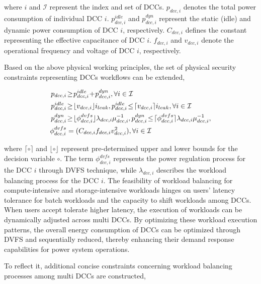 \documentclass[lettersize,journal]{IEEEtran}
\begin{document}
\noindent
where $i$ and $\mathcal{I}$ represent the index and set of DCCs. $p_{dcc,i}$ denotes the total power consumption of individual DCC $i$. $p_{dcc,i}^{idle}$ and $p_{dcc,i}^{dyn}$ represent the static (idle) and dynamic power consumption of DCC $i$, respectively. $C_{dcc,i}$ defines the constant representing the effective capacitance of DCC $i$. $f_{dcc,i}$ and $v_{dcc,i}$ denote the operational frequency and voltage of DCC $i$, respectively.

Based on the above physical working principles, the set of physical security constraints representing DCCs workflows can be extended,

\vspace{-0.25cm}
\begin{subequations}
  \begin{align}
    p_{dcc,i} & \!\geq\! p_{dcc,i}^{idle} \!+\! p_{dcc,i}^{dyn},\forall i\in\mathcal{I}\\
    p_{dcc,i}^{idle} &\!\geq\! \lfloor {v}_{dcc,i}\rfloor i_{leak},p_{dcc,i}^{idle} \!\leq\! \lceil {v}_{dcc,i}\rceil i_{leak},\forall i\in\mathcal{I}\\
    p_{dcc,i}^{dyn}& \!\geq\! \lfloor \phi_{dcc,i}^{dvfs} \rfloor {\lambda_{dcc,i}}{\mu_{dcc,i}^{-1}}, p_{dcc,i}^{dyn} \!\leq\! \lceil \phi_{dcc,i}^{dvfs} \rceil {\lambda_{dcc,i}}{\mu_{dcc,i}^{-1}},\notag \\
    \phi_{dcc,i}^{dvfs} &= ( C_{dcc,i} f_{dcc,i} v_{dcc,i}^{2} ), \forall i\in \mathcal{I}
  \end{align}
\end{subequations}

\noindent
where $\lceil {\circ} \rceil$ and $\lfloor {\circ} \rfloor$ represent pre-determined upper and lower bounds for the decision variable $\circ$. The term $\phi_{dcc,i}^{dvfs}$ represents the power regulation process for the DCC $i$ through DVFS technique, while $\lambda_{dcc,i}$ describes the workload balancing process for the DCC $i$. The feasibility of workload balancing for compute-intensive and storage-intensive workloads hinges on users' latency tolerance for batch workloads and the capacity to shift workloads among DCCs. When users accept tolerate higher latency, the execution of workloads can be dynamically adjusted across multi DCCs. By optimizing these workload execution patterns, the overall energy consumption of DCCs can be optimized through DVFS and sequentially reduced, thereby enhancing their demand response capabilities for power system operations.

To reflect it, additional concise constraints concerning workload balancing processes among multi DCCs are constructed,
\end{document}
